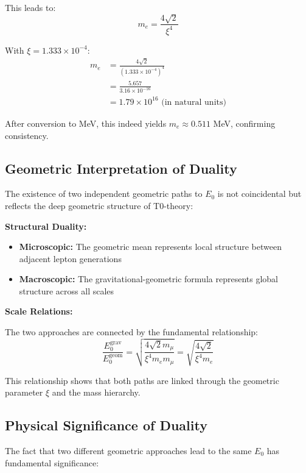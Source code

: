 \documentclass[12pt,a4paper]{article}
\begin{document}
	This leads to:
	\begin{equation}
		m_e = \frac{4\sqrt{2}}{\xi^4}
	\end{equation}
	
	With $\xi = 1.333 \times 10^{-4}$:
	\begin{align}
		m_e &= \frac{4\sqrt{2}}{(1.333 \times 10^{-4})^4}\\
		&= \frac{5.657}{3.16 \times 10^{-16}}\\
		&= 1.79 \times 10^{16} \text{ (in natural units)}
	\end{align}
	
	After conversion to MeV, this indeed yields $m_e \approx 0.511$ MeV, confirming consistency.
	
	\subsection{Geometric Interpretation of Duality}
	
	The existence of two independent geometric paths to $E_0$ is not coincidental but reflects the deep geometric structure of T0-theory:
	
	\textbf{Structural Duality:}
	\begin{itemize}
		\item \textbf{Microscopic:} The geometric mean represents local structure between adjacent lepton generations
		\item \textbf{Macroscopic:} The gravitational-geometric formula represents global structure across all scales
	\end{itemize}
	
	\textbf{Scale Relations:}
	
	The two approaches are connected by the fundamental relationship:
	\begin{equation}
		\frac{E_0^{\text{grav}}}{E_0^{\text{geom}}} = \sqrt{\frac{4\sqrt{2} m_\mu}{\xi^4 m_e m_\mu}} = \sqrt{\frac{4\sqrt{2}}{\xi^4 m_e}}
	\end{equation}
	
	This relationship shows that both paths are linked through the geometric parameter $\xi$ and the mass hierarchy.
	
	\subsection{Physical Significance of Duality}
	
	The fact that two different geometric approaches lead to the same $E_0$ has fundamental significance:
	
\end{document}
